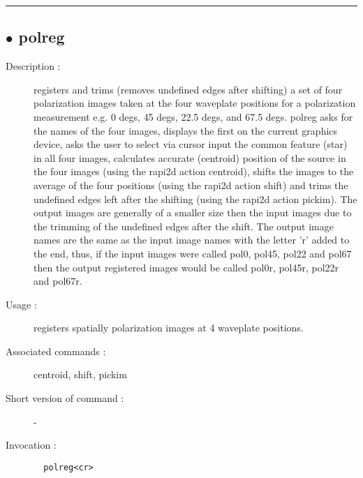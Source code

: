 
\hrule \subsection*{$\bullet$ polreg}
\begin{description}
\item[Description :] registers and trims (removes undefined edges after shifting) a
set of four polarization images taken at the four waveplate positions for
a polarization measurement e.g. 0 degs, 45 degs, 22.5 degs, and 67.5
degs.  polreg asks for the names of the four images, displays the first
on the current graphics device, asks the user to select via cursor input
the common feature (star) in all four images, calculates accurate
(centroid) position of the source in the four images (using the rapi2d
action centroid), shifts the images to the average of the four positions
(using the rapi2d action shift) and trims the undefined edges left after
the shifting (using the rapi2d action pickim).  The output images are
generally of a smaller size then the input images due to the trimming of
the undefined edges after the shift.  The output image names are the same
as the input image names with the letter 'r' added to the end, thus, if
the input images were called pol0, pol45, pol22 and pol67 then the output
registered images would be called pol0r, pol45r, pol22r and pol67r.
\item[Usage :] registers spatially polarization images at 4 waveplate positions.
\item[Associated commands :] centroid, shift, pickim
\item[Short version of command :] -
\item[Invocation :]

\verb+  polreg<cr> +\end{description}

